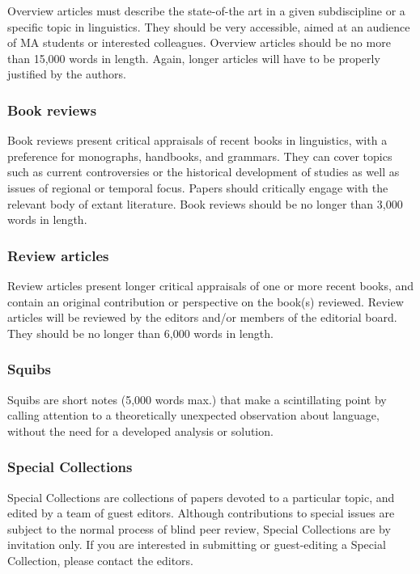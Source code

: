 \documentclass[charis,linguex]{glossa}
\begin{document}
Overview articles must describe the state-of-the art in a given subdiscipline or a specific topic in linguistics. They should be very accessible, aimed at an audience of MA students or interested colleagues. Overview articles should be no more than 15,000 words in length. Again, longer articles will have to be properly justified by the authors.

\subsubsection{Book reviews}

Book reviews present critical appraisals of recent books in linguistics, with a preference for monographs, handbooks, and grammars. They can cover topics such as current controversies or the historical development of studies as well as issues of regional or temporal focus. Papers should critically engage with the relevant body of extant literature. Book reviews should be no longer than 3,000 words in length.

\subsubsection{Review articles}

Review articles present longer critical appraisals of one or more recent books, and contain an original contribution or perspective on the book(s) reviewed. Review articles will be reviewed by the editors and/or members of the editorial board. They should be no longer than 6,000 words in length.

\subsubsection{Squibs}

Squibs are short notes (5,000 words max.) that make a scintillating point by calling attention to a theoretically unexpected observation about language, without the need for a developed analysis or solution.

\subsubsection{Special Collections}

Special Collections are collections of papers devoted to a particular topic, and edited by a team of guest editors. Although contributions to special issues are subject to the normal process of blind peer review, Special Collections are by invitation only. If you are interested in submitting or guest-editing a Special Collection, please contact the editors.
\end{document}
